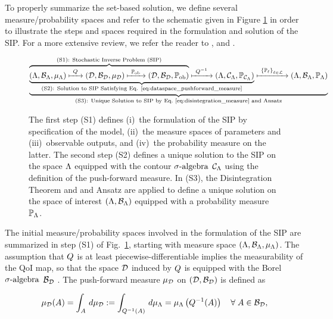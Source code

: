 To properly summarize the set-based solution, we define several measure/probability spaces and refer to the schematic given in Figure \ref{fig:scheme} in order to illustrate the steps and spaces required in the formulation and solution of the SIP.
For a more extensive review, we refer the reader to \cite{BET+14, MBD+15, BBE11, BES12, BET+14}, and \cite{BGE+15}.

\begin{figure}[!h]
\begin{equation}
\underbrace{
\underbrace{
\overbrace{
 ({\Lambda}, \mathcal{B}_{{\Lambda}}, \mu_{{\Lambda}}) \xmapsto{\  Q\ } (\mathcal{D}, \mathcal{B}_{\mathcal{D}}, \mu_{\mathcal{D}})
  \xmapsto{\ \operatorname*{\mathbb{P}_{ob}}\ } (\mathcal{D}, \mathcal{B}_{\mathcal{D}}, \operatorname*{\mathbb{P}_{ob}})
 }^{
 \text{(S1): Stochastic Inverse Problem (SIP)}
 }
 \xmapsto{\ Q^{-1} \ } ({\Lambda}, \mathcal{C}_{{\Lambda}}, \operatorname*{\mathbb{P}_{\mathcal{C}_{{\Lambda}}}})
 }_{
 \text{(S2): Solution to SIP Satisfying Eq. \eqref{eq:dataspace_pushforward_measure}}}
 \xmapsto{\ \left\{\mathbb{P}_\ell\right\}_{\ell\in\mathcal{L}} \ } ({\Lambda}, \mathcal{B}_{{\Lambda}}, \mathbb{P}_{\Lambda})
 }
 _{
 \text{(S3): Unique Solution to SIP by Eq.~\eqref{eq:disintegration_measure} and Ansatz}
 }
\end{equation}
\caption{The first step (S1) defines (i)~the formulation of the SIP by specification of the model, (ii)~the measure spaces of parameters and (iii)~observable outputs, and (iv)~the probability measure on the latter. The second step (S2) defines a unique solution to the SIP on the space ${\Lambda}$ equipped with the contour $\sigma\text{-algebra}$ $\mathcal{C}_{{\Lambda}}$ using the definition of the push-forward measure. In (S3), the Disintegration Theorem and and Ansatz are applied to define a unique solution on the space of interest $({\Lambda}, \mathcal{B}_{{\Lambda}})$ equipped with a probability measure $\mathbb{P}_{\Lambda}$.}
\label{fig:scheme}
\end{figure}


The initial measure/probability spaces involved in the formulation of the SIP are summarized in step (S1) of Fig.~\ref{fig:scheme}, starting with measure space $({\Lambda}, \mathcal{B}_{{\Lambda}}, \mu_{{\Lambda}})$.
The assumption that $Q$ is at least piecewise-differentiable implies the measurability of the QoI map, so that the space $\mathcal{D}$ induced by $Q$ is equipped with the Borel $\sigma\text{-algebra}$ $\mathcal{B}_{\mathcal{D}}$ \citep{Hunter}.
The push-forward measure $\mu_{\mathcal{D}}$ on ${(\mathcal{D}, \mathcal{B}_{\mathcal{D}})}$ is defined as

\begin{equation}\label{eq:dataspace_pushforward_measure}
\mu_{\mathcal{D}} (A) = \int_A \, d\mu_{\mathcal{D}} := \int_{Q^{-1}(A)} \, d\mu_{{\Lambda}} = \mu_{{\Lambda}} \left (Q^{-1}(A) \right ) \quad \forall \;  A\in\mathcal{B}_{\mathcal{D}},
\end{equation}

